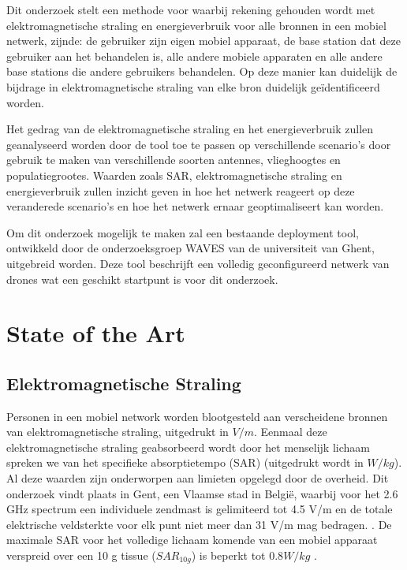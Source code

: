 \documentclass[twocolumn]{phdsymp_dutch}
\begin{document}
Dit onderzoek stelt een methode voor waarbij rekening gehouden wordt met 
elektromagnetische straling en energieverbruik voor alle bronnen in een mobiel netwerk, zijnde: de gebruiker zijn eigen 
mobiel apparaat, de base station dat deze gebruiker aan het behandelen is, alle andere mobiele apparaten en 
alle andere base stations die andere gebruikers behandelen. Op deze manier kan duidelijk de bijdrage in elektromagnetische straling
 van elke bron duidelijk geïdentificeerd worden. 

Het gedrag van de elektromagnetische straling en het energieverbruik zullen geanalyseerd worden door de 
tool toe te passen op verschillende scenario's door gebruik te maken van verschillende soorten antennes, vlieghoogtes 
en populatiegrootes.
Waarden zoals \gls{SAR}, elektromagnetische straling en energieverbruik zullen inzicht 
geven in hoe het netwerk reageert op deze veranderede scenario's en hoe het netwerk 
ernaar geoptimaliseert kan worden.

Om dit onderzoek mogelijk te maken zal een bestaande deployment tool, ontwikkeld
door de onderzoeksgroep WAVES van de universiteit van Ghent, uitgebreid worden. Deze tool 
beschrijft een volledig geconfigureerd netwerk van drones wat een geschikt startpunt is voor dit onderzoek.

\section{State of the Art}
\subsection{Elektromagnetische Straling}

Personen in een mobiel network worden blootgesteld aan verscheidene bronnen van elektromagnetische straling, uitgedrukt in $V/m$.
Eenmaal deze elektromagnetische straling geabsorbeerd wordt door het menselijk lichaam spreken we van het specifieke absorptietempo (\gls{SAR}) (uitgedrukt wordt in $W/kg$).
Al deze waarden zijn onderworpen aan limieten opgelegd door de overheid.
Dit onderzoek vindt plaats in Gent, een Vlaamse stad in Belgi\"e, waarbij voor het 2.6 GHz spectrum een individuele zendmast 
is gelimiteerd tot 4.5 V/m en de totale elektrische veldsterkte voor elk punt niet meer dan 31 V/m mag bedragen.  \cite{J23,S13_normenBelgie}. 
De maximale \gls{SAR} voor het volledige lichaam komende van een mobiel apparaat verspreid over een 
10 g tissue ($SAR_{10g}$) is beperkt tot $0.8 W/kg$ \cite{J30}. 
\end{document}
